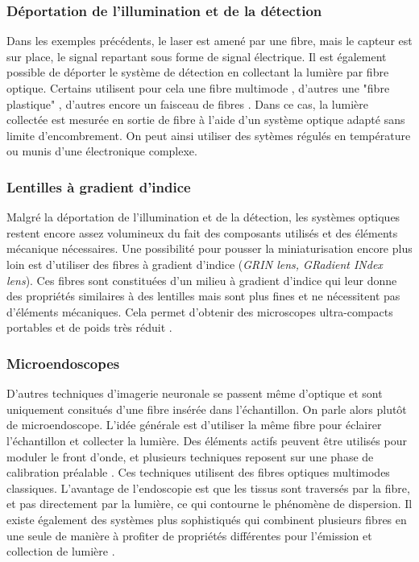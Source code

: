 \subsubsection{Déportation de l'illumination et de la détection}

Dans les exemples précédents, le laser est amené par une fibre, mais le capteur est sur place, le signal repartant sous forme de signal électrique. Il est également possible de déporter le système de détection en collectant la lumière par fibre optique. Certains utilisent pour cela une fibre multimode \cite{piyawattanametha_vivo_2009} \cite{sawinski_visually_2009}, d'autres une "fibre plastique" \cite{klioutchnikov_three-photon_2020}, d'autres encore un faisceau de fibres \cite{zong_fast_2017}. Dans ce cas, la lumière collectée est mesurée en sortie de fibre à l'aide d'un système optique adapté sans limite d'encombrement. On peut ainsi utiliser des sytèmes régulés en température ou munis d'une électronique complexe.

\subsubsection{Lentilles à gradient d'indice}

Malgré la déportation de l'illumination et de la détection, les systèmes optiques restent encore assez volumineux du fait des composants utilisés et des éléments mécanique nécessaires. Une possibilité pour pousser la miniaturisation encore plus loin est d'utiliser des fibres à gradient d'indice (\emph{GRIN lens, GRadient INdex lens}). Ces fibres sont constituées d'un milieu à gradient d'indice qui leur donne des propriétés similaires à des lentilles mais sont plus fines et ne nécessitent pas d'éléments mécaniques. Cela permet d'obtenir des microscopes ultra-compacts portables et de poids très réduit \cite{flusberg_vivo_2005}\cite{engelbrecht_ultra-compact_2008}.

\subsubsection{Microendoscopes}

D'autres techniques d'imagerie neuronale se passent même d'optique et sont uniquement consitués d'une fibre insérée dans l'échantillon. On parle alors plutôt de microendoscope. L'idée générale est d'utiliser la même fibre pour éclairer l'échantillon et collecter la lumière. Des éléments actifs peuvent être utilisés pour moduler le front d'onde, et plusieurs techniques reposent sur une phase de calibration préalable \cite{papadopoulos_high-resolution_2013}\cite{ohayon_minimally_2018}\cite{turtaev_high-fidelity_2018}. Ces techniques utilisent des fibres optiques multimodes classiques. L'avantage de l'endoscopie est que les tissus sont traversés par la fibre, et pas directement par la lumière, ce qui contourne le phénomène de dispersion. Il existe également des systèmes plus sophistiqués qui combinent plusieurs fibres en une seule de manière à profiter de propriétés différentes pour l'émission et collection de lumière \cite{andresen_two-photon_2013}\cite{kudlinski_double_2020}\cite{lombardini_high-resolution_2018}.

